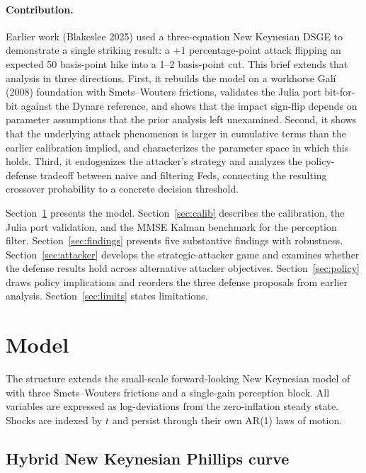 \documentclass[12pt]{article}
\begin{document}
\paragraph{Contribution.}
Earlier work (Blakeslee 2025) used a three-equation New Keynesian DSGE to demonstrate a single striking result: a \(+1\) percentage-point attack flipping an expected 50 basis-point hike into a 1--2 basis-point cut. This brief extends that analysis in three directions. First, it rebuilds the model on a workhorse Galí (2008) foundation with Smets--Wouters \citep{smetswouters2007} frictions, validates the Julia port bit-for-bit against the Dynare reference, and shows that the impact sign-flip depends on parameter assumptions that the prior analysis left unexamined. Second, it shows that the underlying attack phenomenon is larger in cumulative terms than the earlier calibration implied, and characterizes the parameter space in which this holds. Third, it endogenizes the attacker's strategy and analyzes the policy-defense tradeoff between naive and filtering Feds, connecting the resulting crossover probability to a concrete decision threshold.

Section~\ref{sec:model} presents the model. Section~\ref{sec:calib} describes the calibration, the Julia port validation, and the MMSE Kalman benchmark for the perception filter. Section~\ref{sec:findings} presents five substantive findings with robustness. Section~\ref{sec:attacker} develops the strategic-attacker game and examines whether the defense results hold across alternative attacker objectives. Section~\ref{sec:policy} draws policy implications and reorders the three defense proposals from earlier analysis. Section~\ref{sec:limits} states limitations.

\section{Model}\label{sec:model}

The structure extends the small-scale forward-looking New Keynesian model of \citet{gali2008} with three Smets--Wouters \citep{smetswouters2007} frictions and a single-gain perception block. All variables are expressed as log-deviations from the zero-inflation steady state. Shocks are indexed by \(t\) and persist through their own AR(1) laws of motion.

\subsection{Hybrid New Keynesian Phillips curve}
\end{document}
